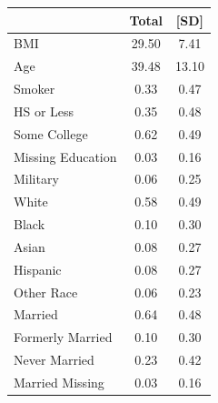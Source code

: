 \def\sym#1{\ifmmode^{#1}\else\(^{#1}\)\fi}
\begin{tabular}{lcc}
\toprule
 & Total & [SD] \\
\midrule
BMI & 29.50 & 7.41 \\
Age & 39.48 & 13.10 \\
Smoker & 0.33 & 0.47 \\
HS or Less & 0.35 & 0.48 \\
Some College & 0.62 & 0.49 \\
Missing Education & 0.03 & 0.16 \\
Military & 0.06 & 0.25 \\
White & 0.58 & 0.49 \\
Black & 0.10 & 0.30 \\
Asian & 0.08 & 0.27 \\
Hispanic & 0.08 & 0.27 \\
Other Race & 0.06 & 0.23 \\
Married & 0.64 & 0.48 \\
Formerly Married & 0.10 & 0.30 \\
Never Married & 0.23 & 0.42 \\
Married Missing & 0.03 & 0.16 \\
\bottomrule
\end{tabular}
